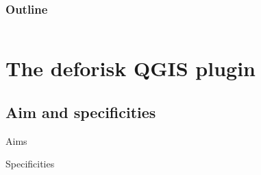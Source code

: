 \documentclass[10pt,table,dvipsnames,compress]{beamer}
\newif\ifplacelogo %
\begin{document}

\placelogotrue
\begin{frame}
  \frametitle{Outline}
  \begin{columns}[c]
    \begin{column}{0.5\textwidth}
      \tableofcontents[sections=1]
      \vspace{0.5cm}
      \tableofcontents[sections=2]
      \vspace{0.5cm}
      \tableofcontents[sections=3]
    \end{column}
    \begin{column}{0.5\textwidth}
        \tableofcontents[sections=4]
        \vspace{0.5cm}
        \tableofcontents[sections=5]
    \end{column}
  \end{columns}
\end{frame}
\placelogofalse

\section{The deforisk QGIS plugin}
\label{sec:orga583b1a}

\subsection{Aim and specificities}
\label{sec:orgc8a08d6}

\begin{frame}[label={sec:org46f9bdf}]{Aims}
\end{frame}

\begin{frame}[label={sec:org9745e5e}]{Specificities}
\end{frame}
\end{document}
